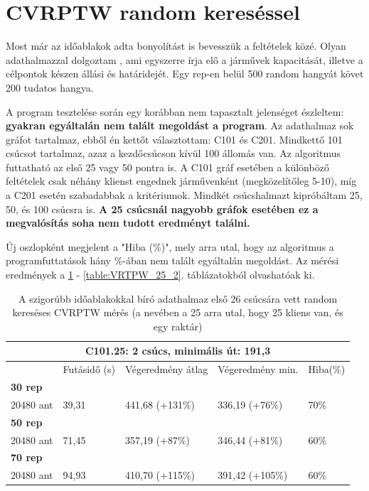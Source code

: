 \newpage
\newpage
\newpage
\newpage

\section{CVRPTW random kereséssel} \label{CVRPTW1section}
Most már az időablakok adta bonyolítást is bevesszük a feltételek közé. Olyan adathalmazzal dolgoztam \cite{VRPTWdataset}, ami egyszerre írja elő a járművek kapacitását, illetve a célpontok készen állási és határidejét. Egy rep-en belül 500 random hangyát követ 200 tudatos hangya.

 A program tesztelése során egy korábban nem tapasztalt jelenséget észleltem: \textbf{gyakran egyáltalán nem talált megoldást a program}.
Az adathalmaz sok gráfot tartalmaz, ebből én kettőt választottam: C101 és C201. Mindkettő 101 csúcsot tartalmaz, azaz a kezdőcsúcson kívül 100 állomás van. Az algoritmus futtatható az első 25 vagy 50 pontra is. A C101 gráf esetében a különböző feltételek csak néhány klienst engednek járművenként (megközelítőleg 5-10), míg a C201 esetén szabadabbak a kritériumok. Mindkét csúcshalmazt kipróbáltam 25, 50, és 100 csúcsra is. \textbf{A 25 csúcsnál nagyobb gráfok esetében ez a megvalósítás soha nem tudott eredményt találni.}

Új oszlopként megjelent a "Hiba (\%)", mely arra utal, hogy az algoritmus a programfuttatások hány \%-ában nem talált egyáltalán megoldást. Az mérési eredmények a \ref{table:VRTPW_25_1} - \ref{table:VRTPW_25_2}. táblázatokból olvashatóak ki.

\begin{table}[ht!]
	\centering
	\begin{tabular}{|p{1.75cm}||p{2cm}|p{3.25cm}|p{3.25cm}|p{1.5cm}|}
		\hline
		\multicolumn{5}{|c|}{C101.25: 2 csúcs, minimális út: 191,3} \\
		\hline
		& Futásidő (s) & Végeredmény átlag & Végeredmény min. & Hiba(\%) \\
		\hline
		\textbf{30 rep} &  &  &  &  \\
		20480 ant & 39,31 & 441,68 (+131\%) & 336,19 (+76\%) & 70\% \\
		\hline
		\textbf{50 rep} &  &  &  &  \\
		20480 ant & 71,45 & 357,19 (+87\%) & 346,44 (+81\%) & 60\% \\
		\hline
		\textbf{70 rep} &  &  &  &  \\
		20480 ant & 94,93 & 410,70 (+115\%) & 391,42 (+105\%) & 60\% \\
		\hline
	\end{tabular}
	\caption{A szigorúbb időablakokkal bíró adathalmaz első 26 csúcsára vett random kereséses CVRPTW mérés (a nevében a 25 arra utal, hogy 25 kliens van, és egy raktár)}
	\label{table:VRTPW_25_1}
\end{table}

